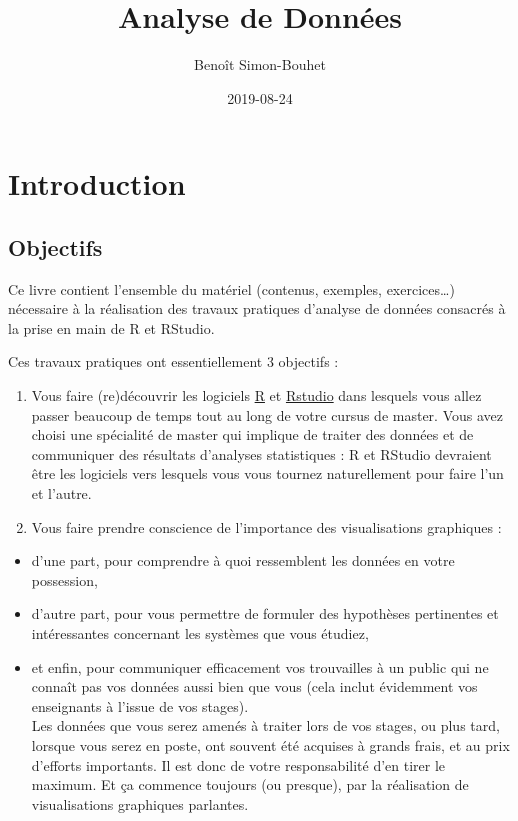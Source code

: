 \documentclass[a4paperpaper,]{article}
\title{Analyse de Données}
\author{Benoît Simon-Bouhet}
\date{2019-08-24}
\providecommand{\tightlist}{%
  \setlength{\itemsep}{0pt}\setlength{\parskip}{0pt}}
\begin{document}
\maketitle

{
\hypersetup{linkcolor=black}
\setcounter{tocdepth}{2}
\tableofcontents
}
\hypertarget{introduction}{%
\section{Introduction}\label{introduction}}

\hypertarget{objectifs}{%
\subsection{Objectifs}\label{objectifs}}

Ce livre contient l'ensemble du matériel (contenus, exemples, exercices\ldots{}) nécessaire à la réalisation des travaux pratiques d'analyse de données consacrés à la prise en main de R et RStudio.

Ces travaux pratiques ont essentiellement 3 objectifs :

\begin{enumerate}
\def\labelenumi{\arabic{enumi}.}
\tightlist
\item
  Vous faire (re)découvrir les logiciels \href{https://cran.r-project.org}{R} et \href{https://www.rstudio.com}{Rstudio} dans lesquels vous allez passer beaucoup de temps tout au long de votre cursus de master. Vous avez choisi une spécialité de master qui implique de traiter des données et de communiquer des résultats d'analyses statistiques : R et RStudio devraient être les logiciels vers lesquels vous vous tournez naturellement pour faire l'un et l'autre.
\item
  Vous faire prendre conscience de l'importance des visualisations graphiques :
\end{enumerate}

\begin{itemize}
\tightlist
\item
  d'une part, pour comprendre à quoi ressemblent les données en votre possession,
\item
  d'autre part, pour vous permettre de formuler des hypothèses pertinentes et intéressantes concernant les systèmes que vous étudiez,
\item
  et enfin, pour communiquer efficacement vos trouvailles à un public qui ne connaît pas vos données aussi bien que vous (cela inclut évidemment vos enseignants à l'issue de vos stages).\\
  Les données que vous serez amenés à traiter lors de vos stages, ou plus tard, lorsque vous serez en poste, ont souvent été acquises à grands frais, et au prix d'efforts importants. Il est donc de votre responsabilité d'en tirer le maximum. Et ça commence toujours (ou presque), par la réalisation de visualisations graphiques parlantes.
\end{itemize}
\end{document}
